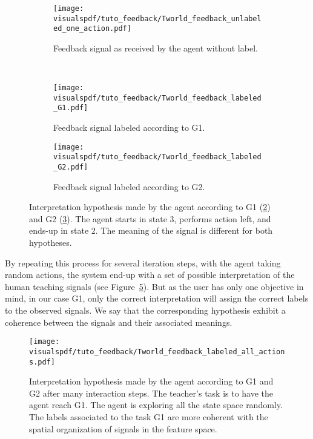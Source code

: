 \begin{figure}[!htbp]
    \centering
    \begin{subfigure}[b]{\tworldsize\columnwidth}
        \centering
        \texttt{[image: \\visualspdf/tuto\_feedback/Tworld\_feedback\_unlabeled\_one\_action.pdf]}
        \caption{Feedback signal as received by the agent without label.}
        \label{fig:TworldLabelunknown}
    \end{subfigure}\\
    \begin{subfigure}[b]{\tworldsize\columnwidth}
        \centering
        \texttt{[image: \\visualspdf/tuto\_feedback/Tworld\_feedback\_labeled\_G1.pdf]}
        \caption{Feedback signal labeled according to G1.}
        \label{fig:TworldLabelG1}
    \end{subfigure}
    \begin{subfigure}[b]{\tworldsize\columnwidth}
        \centering
        \texttt{[image: \\visualspdf/tuto\_feedback/Tworld\_feedback\_labeled\_G2.pdf]}
        \caption{Feedback signal labeled according to G2.}
        \label{fig:TworldLabelG2}
    \end{subfigure}
    \caption{Interpretation hypothesis made by the agent according to G1 (\ref{fig:TworldLabelG1}) and G2 (\ref{fig:TworldLabelG2}). The agent starts in state 3, performs action left, and ends-up in state 2. The meaning of the signal is different for both hypotheses.}
    \label{fig:TworldLabelOneStep}
\end{figure}

By repeating this process for several iteration steps, with the agent taking random actions, the system end-up with a set of possible interpretation of the human teaching signals (see Figure~\ref{fig:TworldLabelinterpretation}). But as the user has only one objective in mind, in our case G1, only the correct interpretation will assign the correct labels to the observed signals. We say that the corresponding hypothesis exhibit a coherence between the signals and their associated meanings.

\begin{figure}[!htbp]
    \centering
    \texttt{[image: \\visualspdf/tuto\_feedback/Tworld\_feedback\_labeled\_all\_actions.pdf]}
    \caption{Interpretation hypothesis made by the agent according to G1 and G2 after many interaction steps. The teacher's task is to have the agent reach G1. The agent is exploring all the state space randomly. The labels associated to the task G1 are more coherent with the spatial organization of signals in the feature space.}
    \label{fig:TworldLabelinterpretation}
\end{figure}

